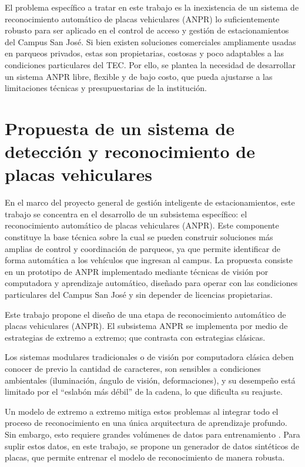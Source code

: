 El problema específico a tratar en este trabajo es la inexistencia de un 
sistema de reconocimiento automático de placas vehiculares (ANPR)
lo suficientemente robusto para ser aplicado en el control de acceso y
gestión de estacionamientos del Campus San José.
Si bien existen soluciones comerciales ampliamente usadas en parqueos privados,
estas son propietarias, costosas y poco adaptables a las condiciones particulares del TEC.
Por ello, se plantea la necesidad de desarrollar un sistema ANPR libre,
flexible y de bajo costo, que pueda ajustarse a las limitaciones técnicas y
presupuestarias de la institución.

\section{Propuesta de un sistema de detección y reconocimiento de placas vehiculares}

En el marco del proyecto general de gestión inteligente de estacionamientos,
este trabajo se concentra en el desarrollo de un subsistema específico:
el reconocimiento automático de placas vehiculares (ANPR).
Este componente constituye la base técnica sobre la cual se pueden construir 
soluciones más amplias de control y coordinación de parqueos,
ya que permite identificar de forma automática a los vehículos que ingresan al campus.
La propuesta consiste en un prototipo de ANPR implementado mediante técnicas de 
visión por computadora y aprendizaje automático,
diseñado para operar con las condiciones particulares del Campus San José y
sin depender de licencias propietarias.

Este trabajo propone el diseño de una etapa de reconocimiento automático de placas vehiculares (ANPR).
El subsistema ANPR se implementa por medio de estrategias de extremo a extremo; 
que contrasta con estrategias clásicas.

Los sistemas modulares tradicionales o de visión por computadora clásica 
deben conocer de previo la cantidad de caracteres,
son sensibles a condiciones ambientales (iluminación, ángulo de visión, deformaciones),
y su desempeño está limitado por el “eslabón más débil” de la cadena, lo que dificulta su reajuste.

Un modelo de extremo a extremo mitiga estos problemas al integrar todo el proceso de reconocimiento 
en una única arquitectura de aprendizaje profundo. Sin embargo, esto requiere grandes volúmenes 
de datos para entrenamiento \cite{endToEndDepthwise}. Para suplir estos datos, en este trabajo, se propone 
un generador de datos sintéticos de placas, que permite entrenar el modelo de reconocimiento de manera robusta.

